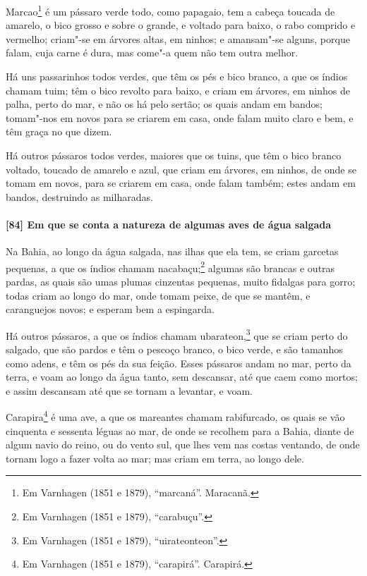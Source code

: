 \begin{linenumbers}
Marcao\footnote{ Em Varnhagen (1851 e 1879), ``marcaná''. Maracanã.} é um pássaro verde
todo, como papagaio, tem a cabeça toucada de amarelo, o bico grosso e sobre o grande, e
voltado para baixo, o rabo comprido e vermelho; criam"-se em árvores altas, em ninhos; e
amansam"-se alguns, porque falam, cuja carne é dura, mas come"-a quem não tem outra melhor.

Há uns passarinhos todos verdes, que têm os pés e bico branco, a que os índios chamam
tuim; têm o bico revolto para baixo, e criam em árvores, em ninhos de palha, perto do mar,
e não os há pelo sertão; os quais andam em bandos; tomam"-nos em novos para se criarem em
casa, onde falam muito claro e bem, e têm graça no que dizem.

Há outros pássaros todos verdes, maiores que os tuins, que têm o bico branco voltado,
toucado de amarelo e azul, que criam em árvores, em ninhos, de onde se tomam em novos,
para se criarem em casa, onde falam também; estes andam em bandos, destruindo as
milharadas.

\paragraph{[84] Em que se conta a natureza de algumas aves de água salgada}\quad
Na Bahia, ao longo da água salgada, nas ilhas que ela tem, se criam garcetas pequenas, a
que os índios chamam nacabaçu;\footnote{ Em Varnhagen (1851 e 1879), ``carabuçu''.}
algumas são brancas e outras pardas, as quais são umas plumas cinzentas pequenas, muito
fidalgas para gorro; todas criam ao longo do mar, onde tomam peixe, de que se mantêm, e
caranguejos novos; e esperam bem a espingarda.

Há outros pássaros, a que os índios chamam ubarateon,\footnote{ Em Varnhagen (1851 e 1879),
``uirateonteon''.} que se criam perto do salgado, que são pardos e têm o pescoço branco,
o bico verde, e são tamanhos como adens, e têm os pés da sua feição. Esses pássaros andam
no mar, perto da terra, e voam ao longo da água tanto, sem descansar, até que caem como
mortos; e assim descansam até que se tornam a levantar, e voam.

Carapira\footnote{ Em Varnhagen (1851 e 1879), ``carapirá''. Carapirá.} é uma ave, a que
os mareantes chamam rabifurcado, os quais se vão cinquenta e sessenta léguas ao mar, de
onde se recolhem para a Bahia, diante de algum navio do reino, ou do vento sul, que lhes
vem nas costas ventando, de onde tornam logo a fazer volta ao mar; mas criam em terra, ao
longo dele.


\end{linenumbers}
